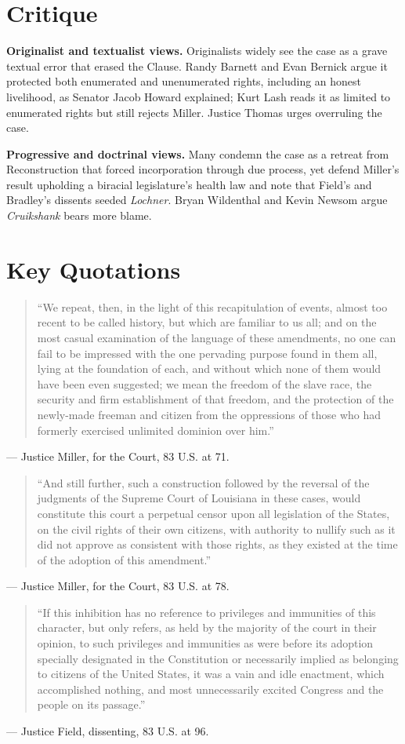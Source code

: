 \documentclass[12pt]{article}
\begin{document}
\section{Critique}

\textbf{Originalist and textualist views.} Originalists widely see the case as a grave textual error that erased the Clause. Randy Barnett and Evan Bernick argue it protected both enumerated and unenumerated rights, including an honest livelihood, as Senator Jacob Howard explained; Kurt Lash reads it as limited to enumerated rights but still rejects Miller. Justice Thomas urges overruling the case.

\textbf{Progressive and doctrinal views.} Many condemn the case as a retreat from Reconstruction that forced incorporation through due process, yet defend Miller's result upholding a biracial legislature's health law and note that Field's and Bradley's dissents seeded \textit{Lochner}. Bryan Wildenthal and Kevin Newsom argue \textit{Cruikshank} bears more blame.

\section{Key Quotations}

\begin{quote}
``We repeat, then, in the light of this recapitulation of events, almost too recent to be called history, but which are familiar to us all; and on the most casual examination of the language of these amendments, no one can fail to be impressed with the one pervading purpose found in them all, lying at the foundation of each, and without which none of them would have been even suggested; we mean the freedom of the slave race, the security and firm establishment of that freedom, and the protection of the newly-made freeman and citizen from the oppressions of those who had formerly exercised unlimited dominion over him.''
\end{quote}
\noindent --- Justice Miller, for the Court, 83 U.S. at 71.

\begin{quote}
``And still further, such a construction followed by the reversal of the judgments of the Supreme Court of Louisiana in these cases, would constitute this court a perpetual censor upon all legislation of the States, on the civil rights of their own citizens, with authority to nullify such as it did not approve as consistent with those rights, as they existed at the time of the adoption of this amendment.''
\end{quote}
\noindent --- Justice Miller, for the Court, 83 U.S. at 78.

\begin{quote}
``If this inhibition has no reference to privileges and immunities of this character, but only refers, as held by the majority of the court in their opinion, to such privileges and immunities as were before its adoption specially designated in the Constitution or necessarily implied as belonging to citizens of the United States, it was a vain and idle enactment, which accomplished nothing, and most unnecessarily excited Congress and the people on its passage.''
\end{quote}
\noindent --- Justice Field, dissenting, 83 U.S. at 96.
\end{document}
